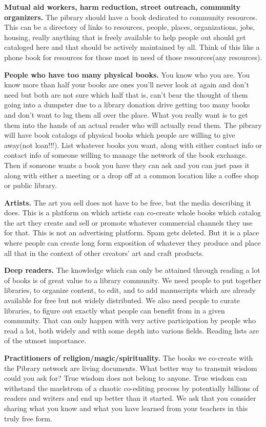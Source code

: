 \textbf{Mutual aid workers, harm reduction, street outreach, community
organizers.} The pibrary should have a book dedicated to community
resources. This can be a directory of links to resources, people,
places, organizations, jobs, housing, really anything that is freely
available to help people out should get cataloged here and that should
be actively maintained by all. Think of this like a phone book for
resources for those most in need of those resources(any resources).

\textbf{People who have too many physical books.} You know who you are.
You know more than half your books are ones you'll never look at again
and don't need but both are not sure which half that is, can't bear the
thought of them going into a dumpster due to a library donation drive
getting too many books and don't want to lug them all over the place.
What you really want is to get them into the hands of an actual reader
who will actually read them. The pibrary will have book catalogs of
physical books which people are willing to give away(not loan!!!). List
whatever books you want, along with either contact info or contact info
of someone willing to manage the network of the book exchange. Then if
someone wants a book you have they can ask and you can just pass it
along with either a meeting or a drop off at a common location like a
coffee shop or public library.

\textbf{Artists.} The art you sell does not have to be free, but the
media describing it does. This is a platform on which artists can
co-create whole books which catalog the art they create and sell or
promote whatever commercial channels they use for that. This is not an
advertising platform. Spam gets deleted. But it is a place where people
can create long form exposition of whatever they produce and place all
that in the context of other creators' art and craft products.

\textbf{Deep readers.} The knowledge which can only be attained through
reading a lot of books is of great value to a library community. We need
people to put together libraries, to organize content, to edit, and to
add manuscripts which are already available for free but not widely
distributed. We also need people to curate libraries, to figure out
exactly what people can benefit from in a given community. That can only
happen with very active participation by people who read a lot, both
widely and with some depth into various fields. Reading lists are of the
utmost importance.

\textbf{Practitioners of religion/magic/spirituality.} The books we
co-create with the Pibrary network are living documents. What better way
to transmit wisdom could you ask for? True wisdom does not belong to
anyone. True wisdom can withstand the maelstrom of a chaotic co-editing
process by potentially billions of readers and writers and end up better
than it started. We ask that you consider sharing what you know and what
you have learned from your teachers in this truly free form.

